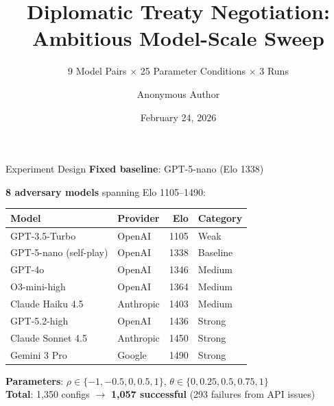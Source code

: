 \documentclass[aspectratio=169]{beamer}
\title{Diplomatic Treaty Negotiation:\\Ambitious Model-Scale Sweep}
\subtitle{9 Model Pairs $\times$ 25 Parameter Conditions $\times$ 3 Runs}
\author{Anonymous Author}
\date{February 24, 2026}
\begin{document}
\frame{\titlepage}

\begin{frame}{Experiment Design}
\textbf{Fixed baseline}: GPT-5-nano (Elo 1338)

\vspace{0.3cm}
\textbf{8 adversary models} spanning Elo 1105--1490:

\begin{center}
\small
\begin{tabular}{llrl}
\toprule
Model & Provider & Elo & Category \\
\midrule
GPT-3.5-Turbo & OpenAI & 1105 & Weak \\
GPT-5-nano (self-play) & OpenAI & 1338 & Baseline \\
GPT-4o & OpenAI & 1346 & Medium \\
O3-mini-high & OpenAI & 1364 & Medium \\
Claude Haiku 4.5 & Anthropic & 1403 & Medium \\
GPT-5.2-high & OpenAI & 1436 & Strong \\
Claude Sonnet 4.5 & Anthropic & 1450 & Strong \\
Gemini 3 Pro & Google & 1490 & Strong \\
\bottomrule
\end{tabular}
\end{center}

\vspace{0.2cm}
\textbf{Parameters}: $\rho \in \{-1, -0.5, 0, 0.5, 1\}$, $\theta \in \{0, 0.25, 0.5, 0.75, 1\}$ \\
\textbf{Total}: 1,350 configs $\rightarrow$ \textbf{1,057 successful} (293 failures from API issues)
\end{frame}
\end{document}
